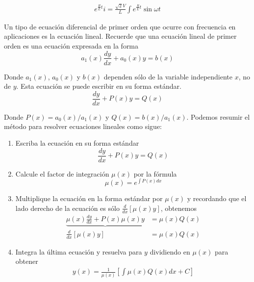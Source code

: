 \documentclass{article}
\begin{document}
\begin{align}
	e^{\frac{R}{L}t} i = \frac{\sqrt{2}V}{L} \int e^{\frac{R}{L}t}\sin \omega t 
\end{align}

\begin{info} %
	Un tipo de ecuación diferencial de primer orden que ocurre con frecuencia en aplicaciones es la ecuación lineal. Recuerde que una ecuación lineal de primer orden es una ecuación expresada en la forma
	\begin{equation}
		a_1(x)\frac{dy}{dx} + a_0(x)y = b(x) \nonumber
	\end{equation}

	Donde $a_1(x)$, $a_0(x)$ y $b(x)$ dependen sólo de la variable independiente $x$, no de $y$. Esta ecuación se puede escribir en su forma estándar.
	\begin{equation}
		\frac{dy}{dx} + P(x)y = Q(x) \nonumber
	\end{equation}

	Donde $P(x)=a_0(x)/a_1(x)$ y $Q(x) = b(x)/a_1(x)$. Podemos resumir el método para resolver ecuaciones lineales como sigue:
	\begin{enumerate}
		\item Escriba la ecuación en su forma estándar
		\begin{equation}
			\frac{dy}{dx} + P(x)y = Q(x) \nonumber
		\end{equation}
		\item Calcule el factor de integración $\mu (x)$ por la fórmula
		\begin{equation}
			\mu (x) = e^{\int {P(x) dx}} \nonumber
		\end{equation}
		\item Multiplique la ecuación en la forma estándar por $\mu (x)$ y recordando que el lado derecho de la ecuación es sólo $\frac{d}{dx} [\mu (x)y]$, obtenemos 
			\begin{align}
				\underbrace{\mu (x) \frac{dy}{dx} + P(x)\mu (x)y} &= \mu (x)Q(x) \nonumber\\
				\frac{d}{dx}[\mu (x)y] &= \mu (x)Q(x) \nonumber	
			\end{align}

		\item Integra la última ecuación y resuelva para $y$ dividiendo en $\mu (x)$ para obtener
		\begin{align}
			y(x) = \frac{1}{\mu (x)}\left[ \int \mu(x)Q(x)dx + C \right] \nonumber
		\end{align}
	\end{enumerate}
\end{info}
\end{document}
